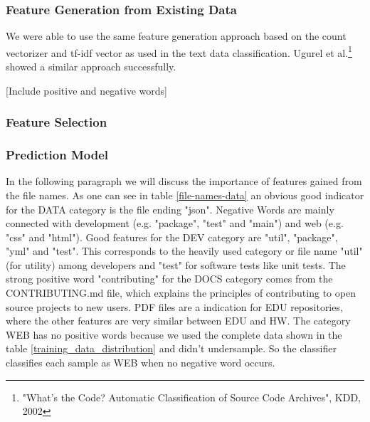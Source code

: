 \documentclass[%
a4paper,
DIV12,
2.5headlines,
bigheadings,
titlepage,
openbib,
]{scrartcl}
\begin{document}
\subsubsection{Feature Generation from Existing
Data}\label{feature-generation-from-existing-data-1}

We were able to use the same feature generation approach based on the count vectorizer and tf-idf vector as used in the text data classification.
Ugurel et al.\footnote{"What's the Code? Automatic Classification of Source Code Archives", KDD, 2002} showed a similar approach successfully.

[Include positive and negative words]

\subsubsection{Feature Selection}\label{feature-selection-2}


\subsubsection{Prediction Model}\label{prediction-model-2}




In the following paragraph we will discuss the importance of features gained from the file names.
As one can see in table \ref{file-names-data} an obvious good indicator for the DATA category is the file ending "json".
Negative Words are mainly connected with development (e.g. "package", "test" and "main") and web (e.g. "css" and "html").
Good features for the DEV category are "util", "package", "yml" and "test".
This corresponds to the heavily used category or file name "util" (for utility) among developers and "test" for software tests like unit tests.
The strong positive word "contributing" for the DOCS category comes from the CONTRIBUTING.md file, which explains the principles of contributing to open source projects to new users.
PDF files are a indication for EDU repositories, where the other features are very similar between EDU and HW.
The category WEB has no positive words because we used the complete data shown in the table \ref{training_data_distribution} and didn't undersample.
So the classifier classifies each sample as WEB when no negative word occurs.
\end{document}
